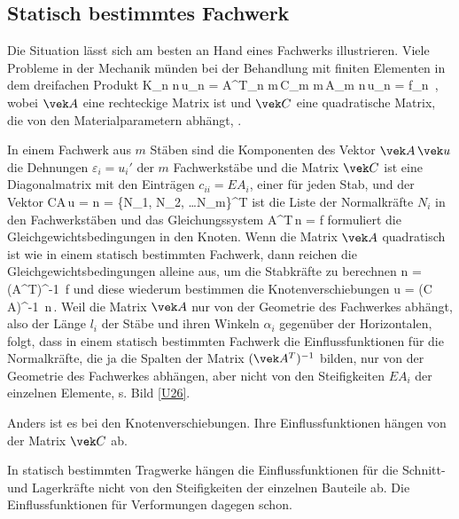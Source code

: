{{{%
{\textcolor{blau2}{\subsection{Statisch bestimmtes Fachwerk}}}

Die Situation l\"{a}sst sich am besten an Hand eines Fachwerks illustrieren.
Viele Probleme in der Mechanik m\"{u}nden bei der Behandlung mit finiten Elementen in dem dreifachen Produkt
\beq
\vek K_{n \times n}\,\vek u_{n } = \vek A^T_{n \times m}\,\vek C_{m \times m}\,\vek A_{m \times n}\,\vek u_{n } = \vek f_{n }\,,
\eeq
wobei $\vek A$ eine rechteckige Matrix ist und $\vek C$ eine quadratische Matrix, die von den Materialparametern abh\"{a}ngt, \cite{Strang4}.

In einem Fachwerk aus $m$ St\"{a}ben sind die Komponenten des Vektor $\vek A\,\vek u$ die Dehnungen $\varepsilon_i = u_i'$ der $m$ Fachwerkst\"{a}be und die Matrix $\vek C$ ist eine Diagonalmatrix mit den Eintr\"{a}gen $c_{ii} = EA_i$, einer f\"{u}r jeden Stab, und der Vektor
\beq
\vek C\vek A\,\vek u = \vek n = \{N_1, N_2, \ldots N_m\}^T
\eeq
ist die Liste der Normalkr\"{a}fte $N_i$ in den Fachwerkst\"{a}ben und das Gleichungssystem
\beq
\vek A^T\,\vek n = \vek f
\eeq
formuliert die Gleichgewichtsbedingungen in den Knoten. Wenn die Matrix $\vek A$ quadratisch ist wie in einem statisch bestimmten Fachwerk, dann reichen die Gleichgewichtsbedingungen alleine aus, um die Stabkr\"{a}fte zu berechnen
\beq
\vek n = (\vek A^T)^{-1} \,\vek f
\eeq
und diese wiederum bestimmen die Knotenverschiebungen
\beq
\vek u = (\vek C\,\vek A)^{-1} \,\vek n\,.
\eeq
Weil die Matrix $\vek A$ nur von der Geometrie des Fachwerkes abh\"{a}ngt, also der L\"{a}nge  $l_i$ der St\"{a}be und ihren Winkeln $\alpha_i$ gegen\"{u}ber der Horizontalen, folgt, dass in einem statisch bestimmten Fachwerk die Einflussfunktionen f\"{u}r die Normalkr\"{a}fte, die ja die Spalten der Matrix $(\vek A^T)^{-1}$ bilden, nur von der Geometrie des Fachwerkes abh\"{a}ngen, aber nicht von den Steifigkeiten $EA_i$ der einzelnen Elemente, s. Bild \ref{U26}.

Anders ist es bei den Knotenverschiebungen. Ihre Einflussfunktionen h\"{a}ngen von der Matrix $\vek C$ ab.\\

\hspace*{-12pt}\colorbox{hellgrau}{\parbox{0.98\textwidth}{In statisch bestimmten Tragwerke h\"{a}ngen die Einflussfunktionen f\"{u}r die Schnitt- und Lagerkr\"{a}fte nicht von den Steifigkeiten der einzelnen Bauteile ab. Die Einflussfunktionen f\"{u}r Verformungen dagegen schon.}}\\

}}}
